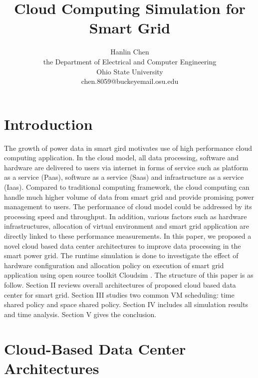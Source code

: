 \documentclass[12pt]{article}
\begin{document}
\title{\textbf{Cloud Computing Simulation for Smart Grid}}
\author{Hanlin Chen\\the Department of Electrical and Computer Engineering\\Ohio State University\\ chen.8059@buckeyemail.osu.edu}
\maketitle 

\section{Introduction}
The growth of power  data in smart gird motivates use of high performance cloud computing  application. In the cloud model, all data processing, software and hardware are delivered to users via internet in forms of service such as platform as a service (Paas), software as a service (Saas) and infrastructure as a service (Iaas). Compared to traditional computing framework, the cloud computing can handle much higher volume of data from smart grid and provide promising power management to users. The performance of cloud model could be addressed by its processing speed and throughput. In addition, various factors such as hardware infrastructures, allocation of virtual environment and smart grid application are directly linked to these performance measurements. In this paper, we proposed a novel cloud based data center architectures to improve data processing in the smart power grid. 
The runtime simulation is done to investigate the effect of hardware configuration and allocation policy on execution of smart grid application using open source toolkit Cloudsim \cite{ok}. The structure of this paper is as follow. Section II reviews overall architectures of proposed cloud based data center for smart grid. Section III studies two common VM scheduling: time shared policy and space shared policy. Section IV includes all simulation results and time analysis. Section V gives the conclusion. 

\section{Cloud-Based Data Center Architectures}
\end{document}
